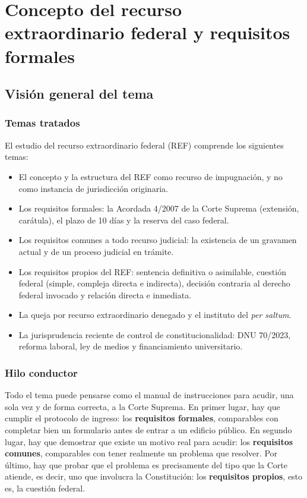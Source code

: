\documentclass[12pt,oneside]{book}
\begin{document}
\mainmatter

\chapter[Concepto y requisitos formales]{Concepto del recurso extraordinario federal y requisitos formales}

\section{Visión general del tema}

\subsection{Temas tratados}

El estudio del recurso extraordinario federal (REF) comprende los siguientes temas:

\begin{itemize}
    \item El concepto y la estructura del REF como recurso de impugnación, y no como instancia de jurisdicción originaria.
    \item Los requisitos formales: la Acordada 4/2007 de la Corte Suprema (extensión, carátula), el plazo de 10 días y la reserva del caso federal.
    \item Los requisitos comunes a todo recurso judicial: la existencia de un gravamen actual y de un proceso judicial en trámite.
    \item Los requisitos propios del REF: sentencia definitiva o asimilable, cuestión federal (simple, compleja directa e indirecta), decisión contraria al derecho federal invocado y relación directa e inmediata.
    \item La queja por recurso extraordinario denegado y el instituto del \textit{per saltum}.
    \item La jurisprudencia reciente de control de constitucionalidad: DNU 70/2023, reforma laboral, ley de medios y financiamiento universitario.
\end{itemize}

\subsection{Hilo conductor}

Todo el tema puede pensarse como el manual de instrucciones para acudir, una sola vez y de forma correcta, a la Corte Suprema. En primer lugar, hay que cumplir el protocolo de ingreso: los \textbf{requisitos formales}, comparables con completar bien un formulario antes de entrar a un edificio público. En segundo lugar, hay que demostrar que existe un motivo real para acudir: los \textbf{requisitos comunes}, comparables con tener realmente un problema que resolver. Por último, hay que probar que el problema es precisamente del tipo que la Corte atiende, es decir, uno que involucra la Constitución: los \textbf{requisitos propios}, esto es, la cuestión federal.
\end{document}
